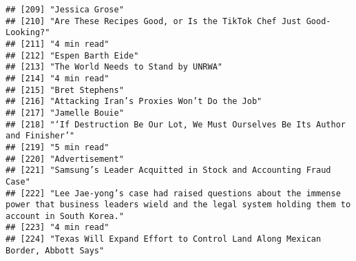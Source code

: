 \documentclass[
]{article}
\begin{document}
\begin{verbatim}
## [209] "Jessica Grose"                                                                                                                                            
## [210] "Are These Recipes Good, or Is the TikTok Chef Just Good-Looking?"                                                                                         
## [211] "4 min read"                                                                                                                                               
## [212] "Espen Barth Eide"                                                                                                                                         
## [213] "The World Needs to Stand by UNRWA"                                                                                                                        
## [214] "4 min read"                                                                                                                                               
## [215] "Bret Stephens"                                                                                                                                            
## [216] "Attacking Iran’s Proxies Won’t Do the Job"                                                                                                                
## [217] "Jamelle Bouie"                                                                                                                                            
## [218] "‘If Destruction Be Our Lot, We Must Ourselves Be Its Author and Finisher’"                                                                                
## [219] "5 min read"                                                                                                                                               
## [220] "Advertisement"                                                                                                                                            
## [221] "Samsung’s Leader Acquitted in Stock and Accounting Fraud Case"                                                                                            
## [222] "Lee Jae-yong’s case had raised questions about the immense power that business leaders wield and the legal system holding them to account in South Korea."
## [223] "4 min read"                                                                                                                                               
## [224] "Texas Will Expand Effort to Control Land Along Mexican Border, Abbott Says"                                                                               

\end{verbatim}
\end{document}
